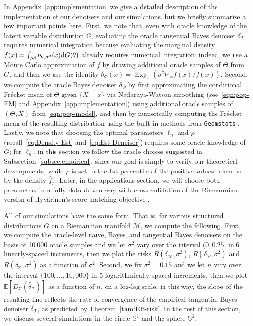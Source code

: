 \documentclass[preprint]{imsart}
\theoremstyle{plain}
\theoremstyle{definition}
\newcommand{\Ebb}{\mathbb{E}}
\newcommand{\Mcal}{\mathcal{M}}
\newcommand{\diff}{\textnormal{d}}
\newcommand{\B}{\mathcal{B}}
\newcommand{\N}{\mathcal{N}}
\newcommand{\T}{\mathcal{T}}
\DeclareMathOperator{\Exp}{Exp}
\begin{document}
In Appendix~\ref{app:implementation} we give a detailed description of the implementation of our denoisers and our simulations, but we briefly summarize a few important points here.
First, we note that, even with oracle knowledge of the latent variable distribution $G$, evaluating the oracle tangential Bayes denoiser $\delta_{\T}$ requires numerical integration because evaluating the marginal density $f(x)=\int_{\Mcal}p_{\theta,\sigma^2}(x)\diff G(\theta)$ already requires numerical integration; indeed, we use a Monte Carlo approximation of $f$ by drawing additional oracle samples of $\Theta$ from $G$, and then we use the identity $\delta_{\T}(x) = \Exp_x(\sigma^2\nabla_xf(x)/f(x))$.
Second, we compute the oracle Bayes denoiser $\delta_{\B}$ by first approximating the {conditional Fr\'echet mean of $\Theta$ given $\{X=x\}$ via Nadaraya-Watson smoothing (see~\eqref{eqn:pop-FM} and Appendix~\ref{app:implementation})} using additional oracle samples of $(\Theta,X)$ from \eqref{eqn:pop-model}, and then by numerically computing the Fr\'echet mean of the resulting distribution using the built-in methods from \texttt{Geomstats} \cite{GeomStats}.
Lastly, we note that choosing the optimal parameters $\ell_n$ and $\rho$ (recall~\eqref{eq:Density-Est} and~\eqref{eq:Est-Denoiser}) requires some oracle knowledge of $G$; for $\ell_n$, in this section we follow the oracle choices suggested in Subsection~\ref{subsec:empirical}, since our goal is simply to verify our theoretical developments, while $\rho$ is set to the 1st percentile of the positive values taken on by the density $\hat{f}_n$.
Later, {in the applications section, we will choose both parameters in a fully data-driven way with cross-validation of the Riemannian version of Hyv\"arinen's score-matching objective \cite{hyvarinen2005,vincent2011connection,de2022riemannian}.}

All of our simulations have the same form.
That is, for various structured distributions $G$ on a Riemannian manifold $\Mcal$, we compute the following.
First, we compute the oracle-level na\"ive, Bayes, and tangential Bayes denoisers on the basis of 10,000 oracle samples and we let $\sigma^2$ vary over the interval $(0,0.25]$ in 6 linearly-spaced increments, then we plot the risks $R(\delta_{\N},\sigma^2)$, $R(\delta_{\B},\sigma^2)$ and $R(\delta_{\T},\sigma^2)$ as a function of $\sigma^2$.
Second, we fix {$\sigma^2=0.15$ and we let $n$ vary over the interval $\{100, \ldots, 10,000\}$ in 5 logarithmically-spaced increments}, then we plot $\Ebb[D_{\T}(\hat{\delta}_{\T})]$ as a function of $n$, on a log-log scale; in this way, the slope of the resulting line reflects the rate of convergence of the empirical tangential Bayes denoiser $\hat{\delta}_{\T}$, as predicted by Theorem~\ref{thm:EB-risk}.
In the rest of this section, we discuss several simulations in the circle $\mathbb{S}^1$ and the sphere $\mathbb{S}^2$.
\end{document}
